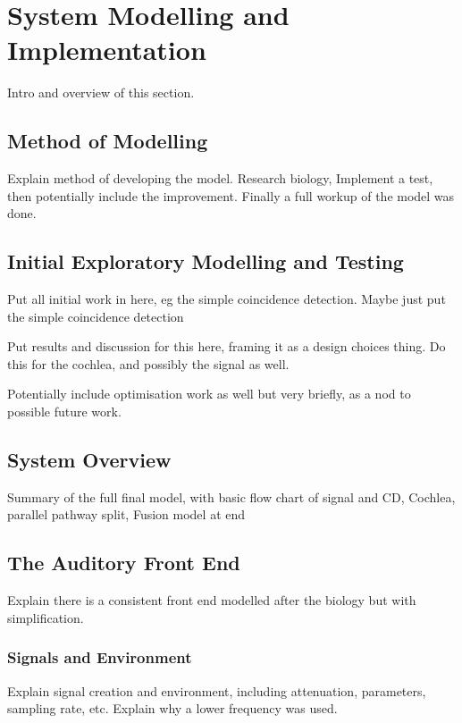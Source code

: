 \chapter{System Modelling and Implementation}

Intro and overview of this section.

\section{Method of Modelling}

Explain method of developing the model. Research biology, Implement a test, then potentially include the improvement. Finally a full workup of the model was done.

\section{Initial Exploratory Modelling and Testing}

Put all initial work in here, eg the simple coincidence detection. Maybe just put the simple coincidence detection

Put results and discussion for this here, framing it as a design choices thing. Do this for the cochlea, and possibly the signal as well.

Potentially include optimisation work as well but very briefly, as a nod to possible future work.

\section{System Overview}

Summary of the full final model, with basic flow chart of signal and CD, Cochlea, parallel pathway split, Fusion model at end

\section{The Auditory Front End}

Explain there is a consistent front end modelled after the biology but with simplification.

\subsection{Signals and Environment}

Explain signal creation and environment, including attenuation, parameters, sampling rate, etc. Explain why a lower frequency was used.

